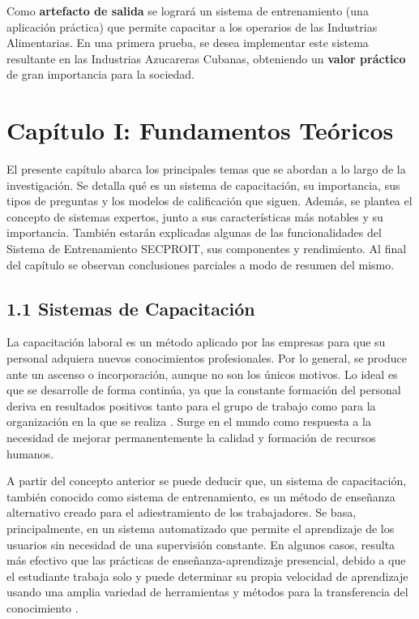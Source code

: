 \documentclass[12pt,a4paper]{report}
\begin{document}
Como \textbf{artefacto de salida} se logrará un sistema de entrenamiento (una aplicación práctica) que permite capacitar a los operarios de las Industrias Alimentarias. En una primera prueba, se desea implementar este sistema resultante en las Industrias Azucareras Cubanas, obteniendo un \textbf{valor práctico} de gran importancia para la sociedad.

\chapter*{Capítulo I: Fundamentos Teóricos}
El presente capítulo abarca los principales temas que se abordan a lo largo de la investigación. Se detalla qué es un sistema de capacitación, su importancia, sus tipos de preguntas y los modelos de calificación que siguen. Además, se plantea el concepto de sistemas expertos, junto a sus características más notables y su importancia. También estarán explicadas algunas de las funcionalidades del Sistema de Entrenamiento SECPROIT, sus componentes y rendimiento.
Al final del capítulo se observan conclusiones parciales a modo de resumen del mismo.

\section*{1.1 Sistemas de Capacitación}
La capacitación laboral es un método aplicado por las empresas para que su personal adquiera nuevos conocimientos profesionales. Por lo general, se produce ante un ascenso o incorporación, aunque no son los únicos motivos. Lo ideal es que se desarrolle de forma continúa, ya que la constante formación del personal deriva en resultados positivos tanto para el grupo de trabajo como para la organización en la que se realiza \cite{blogBizneo}.
Surge en el mundo como respuesta a la necesidad de mejorar permanentemente la calidad y formación de recursos humanos.

A partir del concepto anterior se puede deducir que, un sistema de capacitación, también conocido como sistema de entrenamiento, es un método de enseñanza alternativo creado para el adiestramiento de los trabajadores. Se basa, principalmente, en un sistema automatizado que permite el aprendizaje de los usuarios sin necesidad de una supervisión constante. En algunos casos, resulta más efectivo que las prácticas de enseñanza-aprendizaje presencial, debido a que el estudiante trabaja solo y puede determinar su propia velocidad de aprendizaje usando una amplia variedad de herramientas y métodos para la transferencia del conocimiento \cite{seguridadMinera}.
\end{document}
